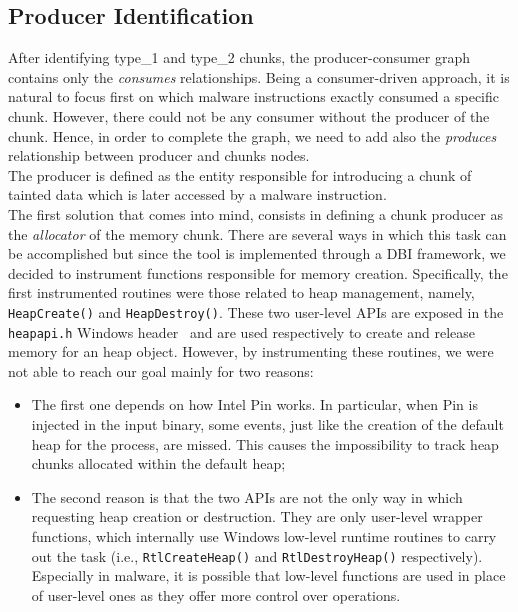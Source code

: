 \documentclass[LaM,binding=0.6cm]{sapthesis}
\begin{document}
\subsection{Producer Identification}
\label{subsec:produceridentification}
After identifying type\_1 and type\_2 chunks, the producer-consumer graph contains only the \textit{consumes} relationships. Being a consumer-driven approach, it is natural to focus first on which malware instructions exactly consumed a specific chunk. However, there could not be any consumer without the producer of the chunk. Hence, in order to complete the graph, we need to add also the \textit{produces} relationship between producer and chunks nodes.\\

The producer is defined as the entity responsible for introducing a chunk of tainted data which is later accessed by a malware instruction.\\
The first solution that comes into mind, consists in defining a chunk producer as the \textit{allocator} of the memory chunk. There are several ways in which this task can be accomplished but since the tool is implemented through a DBI framework, we decided to instrument functions responsible for memory creation. Specifically, the first instrumented routines were those related to heap management, namely, \texttt{HeapCreate()} and \texttt{HeapDestroy()}. These two user-level APIs are exposed in the \texttt{heapapi.h} Windows header~\cite{heapapih77:online} and are used respectively to create and release memory for an heap object. However, by instrumenting these routines, we were not able to reach our goal mainly for two reasons:
\begin{itemize}
\item The first one depends on how Intel Pin works. In particular, when Pin is injected in the input binary, some events, just like the creation of the default heap for the process, are missed. This causes the impossibility to track heap chunks allocated within the default heap;
\item The second reason is that the two APIs are not the only way in which requesting heap creation or destruction. They are only user-level wrapper functions, which internally use Windows low-level runtime routines to carry out the task (i.e., \texttt{RtlCreateHeap()} and \texttt{RtlDestroyHeap()} respectively). Especially in malware, it is possible that low-level functions are used in place of user-level ones as they offer more control over operations.
\end{itemize} 
\end{document}
